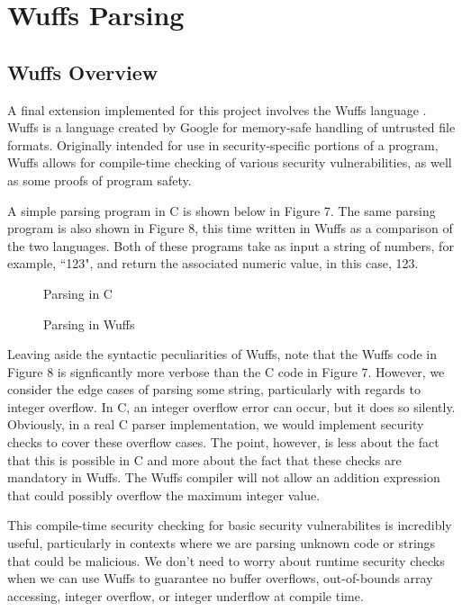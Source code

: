 \documentclass[main.tex]{subfiles}
\begin{document}
\section{Wuffs Parsing}

\subsection{Wuffs Overview}
A final extension implemented for this project involves the Wuffs language \cite{6}.
Wuffs is a language created by Google for memory-safe handling of untrusted file
formats. Originally intended for use in security-specific portions of a program,
Wuffs allows for compile-time checking of various security vulnerabilities, as
well as some proofs of program safety.

A simple parsing program in C is shown below in Figure 7. The same parsing program is also
shown in Figure 8, this time written in Wuffs as a comparison of the two languages. Both of these programs take
as input a string of numbers, for example, ``123", and return the associated numeric value, in this case, 123.
\begin{singlespace}
    \begin{figure}[p]
        
        \caption{Parsing in C}
    \end{figure}
    \begin{figure}[p]
        
        \caption{Parsing in Wuffs}
    \end{figure}
\end{singlespace}
Leaving aside the syntactic peculiarities of Wuffs, note that the Wuffs code in Figure 8 
is signficantly more verbose than the C code in Figure 7. However, we
consider the edge cases of parsing some string, particularly with regards to
integer overflow. In C, an integer overflow error can occur, but it does so
silently. Obviously, in a real C parser implementation, we would implement
security checks to cover these overflow cases. The point, however, is less about
the fact that this is possible in C and more about the fact that these checks
are mandatory in Wuffs. The Wuffs compiler will not allow an addition expression
that could possibly overflow the maximum integer value.

This compile-time security checking for basic security vulnerabilites is
incredibly useful, particularly in contexts where we are parsing unknown code or
strings that could be malicious. We don't need to worry about runtime security
checks when we can use Wuffs to guarantee no buffer overflows, out-of-bounds 
array accessing, integer overflow, or integer underflow at compile time.
\end{document}
